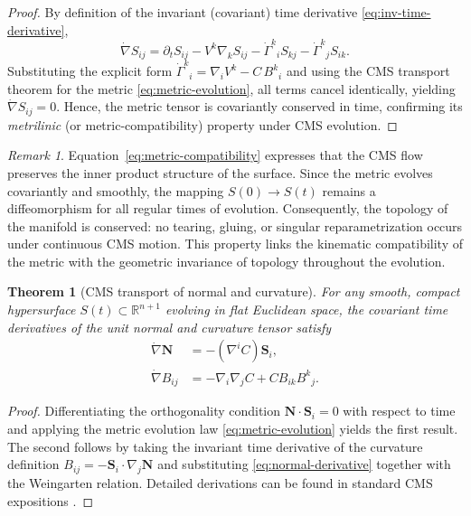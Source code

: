 \documentclass[11pt]{article}
\theoremstyle{definition}
\theoremstyle{plain}
\newtheorem{theorem}[definition]{Theorem}
\theoremstyle{remark}
\newtheorem{remark}[definition]{Remark}
\begin{document}
\begin{proof}
By definition of the invariant (covariant) time derivative \eqref{eq:inv-time-derivative},
\[
\dot{\nabla}S_{ij}
= \partial_t S_{ij} - V^k\nabla_k S_{ij}
 - \dot{\Gamma}^k{}_i S_{kj} - \dot{\Gamma}^k{}_j S_{ik}.
\]
Substituting the explicit form $\dot{\Gamma}^k{}_i=\nabla_i V^k - C\,B^k{}_i$
and using the CMS transport theorem for the metric \eqref{eq:metric-evolution},
all terms cancel identically, yielding $\dot{\nabla}S_{ij}=0$.
Hence, the metric tensor is covariantly conserved in time, confirming its \emph{metrilinic} (or metric-compatibility) property under CMS evolution.
\end{proof}

\begin{remark}
Equation~\eqref{eq:metric-compatibility} expresses that the CMS flow preserves the inner product structure of the surface. 
Since the metric evolves covariantly and smoothly, the mapping $S(0) \to S(t)$ remains a diffeomorphism for all regular times of evolution.  
Consequently, the topology of the manifold is conserved: no tearing, gluing, or singular reparametrization occurs under continuous CMS motion.  
This property links the kinematic compatibility of the metric with the geometric invariance of topology throughout the evolution.
\end{remark}


\begin{theorem}[CMS transport of normal and curvature]\label{thm:normal-curvature}
For any smooth, compact hypersurface $S(t)\subset\mathbb{R}^{n+1}$ evolving in flat Euclidean space, the covariant time derivatives of the unit normal and curvature tensor satisfy
\begin{align}
\dot{\nabla}\mathbf{N} &= -(\nabla^{i}C) \mathbf{S}_i, \label{eq:normal-derivative}\\
\dot{\nabla}B_{ij} &= -\nabla_i\nabla_jC + C B_{ik}B^{k}{}_{j}. \label{eq:curvature-derivative}
\end{align}
\end{theorem}

\begin{proof}
Differentiating the orthogonality condition $\mathbf{N}\!\cdot\!\mathbf{S}_i=0$ with respect to time and applying the metric evolution law \eqref{eq:metric-evolution} yields the first result.  
The second follows by taking the invariant time derivative of the curvature definition $B_{ij}=-\mathbf{S}_i \cdot \nabla_j\mathbf{N}$ and substituting \eqref{eq:normal-derivative} together with the Weingarten relation.  
Detailed derivations can be found in standard CMS expositions \cite{Grinfeld2013}.
\end{proof}
\end{document}
